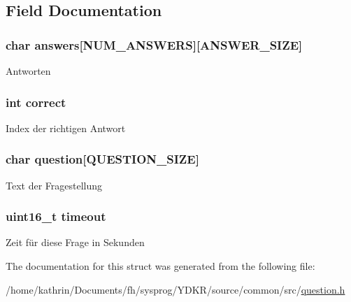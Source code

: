 \subsection{Field Documentation}
\hypertarget{struct_question_aee7134a1e311755686d480c3f8b963c7}{
\subsubsection[{answers}]{\setlength{\rightskip}{0pt plus 5cm}char {\bf answers}\mbox{[}NUM\_\-ANSWERS\mbox{]}\mbox{[}ANSWER\_\-SIZE\mbox{]}}}
\label{struct_question_aee7134a1e311755686d480c3f8b963c7}
Antworten \hypertarget{struct_question_a94acbe75d9eccc82cdebd3d04aaa3d68}{
\subsubsection[{correct}]{\setlength{\rightskip}{0pt plus 5cm}int {\bf correct}}}
\label{struct_question_a94acbe75d9eccc82cdebd3d04aaa3d68}
Index der richtigen Antwort \hypertarget{struct_question_a4b07688ced7937f6eb270f34c6870281}{
\subsubsection[{question}]{\setlength{\rightskip}{0pt plus 5cm}char {\bf question}\mbox{[}QUESTION\_\-SIZE\mbox{]}}}
\label{struct_question_a4b07688ced7937f6eb270f34c6870281}
Text der Fragestellung \hypertarget{struct_question_a7f1ad43d3bf79b40bc39dbb5a6c3a5ae}{
\subsubsection[{timeout}]{\setlength{\rightskip}{0pt plus 5cm}uint16\_\-t {\bf timeout}}}
\label{struct_question_a7f1ad43d3bf79b40bc39dbb5a6c3a5ae}
Zeit für diese Frage in Sekunden 

The documentation for this struct was generated from the following file:\begin{DoxyCompactItemize}
\item 
/home/kathrin/Documents/fh/sysprog/YDKR/source/common/src/\hyperlink{question_8h}{question.h}\end{DoxyCompactItemize}
